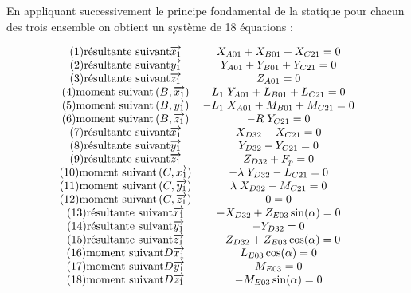 \documentclass[10pt,fleqn]{article} %
\begin{document}
En appliquant successivement le principe fondamental de la statique pour chacun des trois ensemble on obtient un système de 18 équations :

\begin{align*}
\begin{array}{c}
(1) \mbox{résultante suivant} \vect{x_1} \\ 
(2) \mbox{résultante suivant} \vect{y_1} \\ 
(3) \mbox{résultante suivant} \vect{z_1} \\ 
(4) \mbox{moment suivant} \axe{B}{{x_1}} \\ 
(5) \mbox{moment suivant} \axe{B}{{y_1}} \\ 
(6) \mbox{moment suivant} \axe{B}{{z_1}} \\ 
(7) \mbox{résultante suivant} \vect{x_1} \\ 
(8) \mbox{résultante suivant} \vect{y_1} \\ 
(9) \mbox{résultante suivant} \vect{z_1} \\ 
(10) \mbox{moment suivant} \axe{C}{{x_1}} \\ 
(11) \mbox{moment suivant} \axe{C}{{y_1}} \\ 
(12) \mbox{moment suivant} \axe{C}{{z_1}} \\ 
(13) \mbox{résultante suivant} \vect{x_1} \\ 
(14) \mbox{résultante suivant} \vect{y_1} \\ 
(15) \mbox{résultante suivant} \vect{z_1} \\ 
(16) \mbox{moment suivant} {D}{\vect{x_1}} \\ 
(17) \mbox{moment suivant} {D}{\vect{y_1}} \\ 
(18) \mbox{moment suivant} {D}{\vect{z_1}} \\ 
\end{array}
\begin{array}{c}
X_{A01}+X_{B01}+X_{C21}=0 \\
Y_{A01}+Y_{B01}+Y_{C21}=0 \\ 
Z_{A01}=0 \\ 
L_1\;Y_{A01}+L_{B01}+L_{C21}=0 \\ 
-L_1\;X_{A01}+M_{B01}+M_{C21}=0 \\  
-R\;Y_{C21} =0\\
X_{D32}-X_{C21}=0 \\ 
Y_{D32}-Y_{C21}=0 \\  
Z_{D32}+F_p=0 \\ 
-\lambda\;Y_{D32}-L_{C21}=0 \\ 
\lambda\;X_{D32}-M_{C21}=0 \\ 
0 =0\\
-X_{D32}+Z_{E03}\sin(\alpha)=0 \\ 
-Y_{D32}=0 \\ 
-Z_{D32}+Z_{E03}\cos(\alpha)=0 \\ 
L_{E03}\cos(\alpha)=0 \\ 
M_{E03}=0\\ 
-M_{E03}\sin(\alpha)=0\\ 
\end{array}%
\end{align*}
\end{document}
